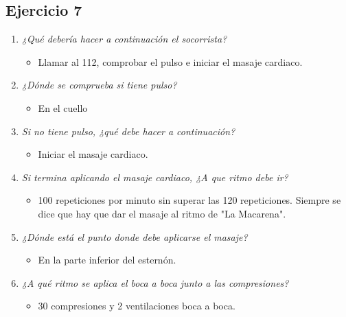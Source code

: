 \documentclass{article}
\begin{document}
    \newpage
      \subsection{Ejercicio 7}
        \begin{enumerate}[label=(\alph*)]
          \item \textit{¿Qué debería hacer a continuación el socorrista?}
            \begin{itemize}
              \item Llamar al 112, comprobar el pulso e iniciar el masaje cardiaco.
            \end{itemize}
          \item \textit{¿Dónde se comprueba si tiene pulso?}
            \begin{itemize}
              \item En el cuello
            \end{itemize}
          \item \textit{Si no tiene pulso, ¿qué debe hacer a continuación?}
            \begin{itemize}
              \item Iniciar el masaje cardiaco.
            \end{itemize}
          \item \textit{Si termina aplicando el masaje cardiaco, ¿A que ritmo debe ir?}
            \begin{itemize}
              \item 100 repeticiones por minuto sin superar las 120 repeticiones. Siempre se dice que hay que dar el masaje al ritmo de "La Macarena".
            \end{itemize}
          \item \textit{¿Dónde está el punto donde debe aplicarse el masaje?}
            \begin{itemize}
              \item En la parte inferior del esternón.
            \end{itemize}
          \item \textit{¿A qué ritmo se aplica el boca a boca junto a las compresiones?}
            \begin{itemize}
              \item 30 compresiones y 2 ventilaciones boca a boca.
            \end{itemize}
        \end{enumerate}
\end{document}
